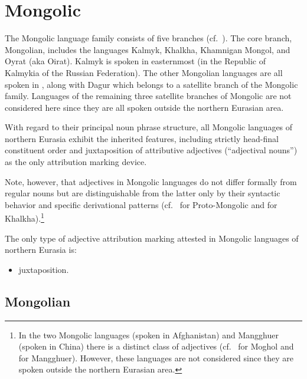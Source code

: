 \section{Mongolic}
The Mongolic language family consists of five branches (cf.~\citealt[222]{salminen2007}). The core branch, Mongolian, includes the languages Kalmyk, Khalkha, Khamnigan Mongol, and Oyrat (aka Oirat). Kalmyk is spoken in easternmost  (in the Republic of Kalmykia of the Russian Federation). The other Mongolian languages are all spoken in , along with Dagur which belongs to a satellite branch of the Mongolic family. Languages of the remaining three satellite branches of Mongolic are not considered here since they are all spoken outside the northern Eurasian area.

With regard to their principal noun phrase structure, all Mongolic languages of northern Eurasia exhibit the inherited  features, including strictly head-final constituent order and juxtaposition of attributive adjectives (“adjectival nouns”) as the only attribution marking device.

Note, however, that adjectives in Mongolic languages do not differ formally from regular nouns but are distinguishable from the latter only by their syntactic behavior and specific derivational patterns (cf.~\citealt[10]{janhunen2003b} for Proto\hyp{}Mongolic and \citealt[161]{svantesson2003} for Khalkha).\footnote{In the two Mongolic languages  (spoken in Afghanistan) and Mangghuer (spoken in China) there is a distinct class of adjectives (cf.~\citealt[252]{weiers2003} for Moghol and \citealt[311]{slater2003} for Mangghuer). However, these languages are not considered since they are spoken outside the northern Eurasian area.}

The only type of adjective attribution marking attested in Mongolic languages of northern Eurasia is:
\begin{itemize}
\item juxtaposition.
\end{itemize}

\subsection{Mongolian}
